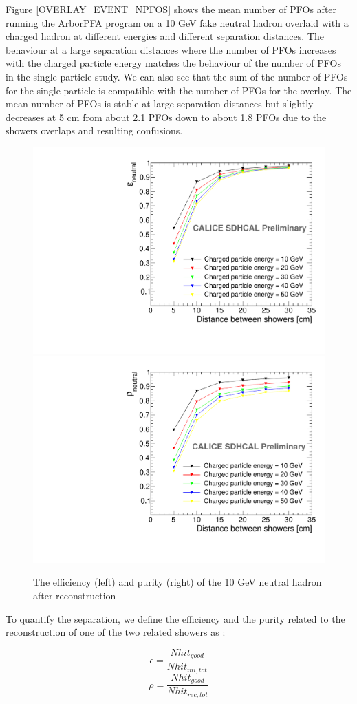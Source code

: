 \documentclass[cits]{JINST}
\begin{document}
Figure \ref{OVERLAY_EVENT_NPFOS} shows the mean number of PFOs after running the ArborPFA program on a 10 GeV fake neutral hadron overlaid with a charged hadron at different energies and different separation distances. The behaviour at a large separation distances where the number of PFOs increases with the charged particle energy matches the behaviour of the number of PFOs in the single particle study. We can also see that the sum of the number of PFOs for the single particle is compatible with the number of PFOs for the overlay. The mean number of PFOs is stable at large separation distances but slightly decreases at 5 cm from about 2.1 PFOs down to about 1.8 PFOs due to the showers overlaps and resulting confusions.

\begin{figure}[!h]
  \begin{center}
    \includegraphics[width=0.47\linewidth]{plots/OverlayEvent_NeutralEfficiency.pdf}
    \includegraphics[width=0.47\linewidth]{plots/OverlayEvent_NeutralPurity.pdf}
  \end{center}
  \caption{\label{OVERLAY_EVENT_PURITY_EFFICIENCY} The efficiency (left) and purity (right) of the 10 GeV neutral hadron after reconstruction}
\end{figure}


To quantify the separation, we define the efficiency and the purity related to the reconstruction of one of the two related showers as :

\begin{equation}
  \epsilon = \frac{Nhit_{good}}{Nhit_{ini,tot}}
\end{equation}
\begin{equation}
  \rho = \frac{Nhit_{good}}{Nhit_{rec,tot}}
\end{equation}
\end{document}
